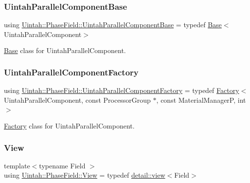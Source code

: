 \subsubsection{\texorpdfstring{Uintah\+Parallel\+Component\+Base}{UintahParallelComponentBase}}
{\footnotesize\ttfamily using \hyperlink{namespaceUintah_1_1PhaseField_a769cb9d270a04e03ff788b4d16ff6c2b}{Uintah\+::\+Phase\+Field\+::\+Uintah\+Parallel\+Component\+Base} = typedef \hyperlink{classUintah_1_1PhaseField_1_1Base}{Base}$<$Uintah\+Parallel\+Component$>$}



\hyperlink{classUintah_1_1PhaseField_1_1Base}{Base} class for Uintah\+Parallel\+Component. 

\mbox{\label{namespaceUintah_1_1PhaseField_aa9f0d6f6090c6c28bf051220734d61d6}} 
\subsubsection{\texorpdfstring{Uintah\+Parallel\+Component\+Factory}{UintahParallelComponentFactory}}
{\footnotesize\ttfamily using \hyperlink{namespaceUintah_1_1PhaseField_aa9f0d6f6090c6c28bf051220734d61d6}{Uintah\+::\+Phase\+Field\+::\+Uintah\+Parallel\+Component\+Factory} = typedef \hyperlink{classUintah_1_1PhaseField_1_1Factory}{Factory}$<$Uintah\+Parallel\+Component, const Processor\+Group $\ast$, const Material\+ManagerP, int$>$}



\hyperlink{classUintah_1_1PhaseField_1_1Factory}{Factory} class for Uintah\+Parallel\+Component. 

\mbox{\label{namespaceUintah_1_1PhaseField_a59210a1e28eba254d428762c92ddeabb}} 
\subsubsection{\texorpdfstring{View}{View}}
{\footnotesize\ttfamily template$<$typename Field $>$ \\
using \hyperlink{namespaceUintah_1_1PhaseField_a59210a1e28eba254d428762c92ddeabb}{Uintah\+::\+Phase\+Field\+::\+View} = typedef \hyperlink{classUintah_1_1PhaseField_1_1detail_1_1view}{detail\+::view}$<$Field$>$}



